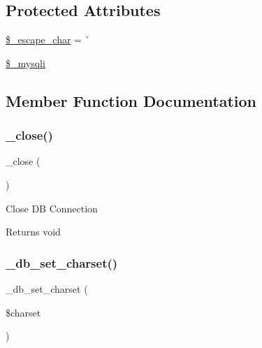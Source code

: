 \subsection*{Protected Attributes}
\begin{DoxyCompactItemize}
\item 
\mbox{\hyperlink{class_c_i___d_b__mysqli__driver_aaec2fb0112850159063a8e47ad3aed6e}{\$\+\_\+escape\+\_\+char}} = \textquotesingle{}\`{}\textquotesingle{}
\item 
\mbox{\hyperlink{class_c_i___d_b__mysqli__driver_ade098f0cd94dc706b24ea590bd540bf4}{\$\+\_\+mysqli}}
\end{DoxyCompactItemize}


\subsection{Member Function Documentation}
\mbox{\label{class_c_i___d_b__mysqli__driver_a4d9082658000e5ede8312067c6dda9db}} 
\subsubsection{\texorpdfstring{\+\_\+close()}{\_close()}}
{\footnotesize\ttfamily \+\_\+close (\begin{DoxyParamCaption}{ }\end{DoxyParamCaption})\hspace{0.3cm}{\ttfamily [protected]}}

Close DB Connection

\begin{DoxyReturn}{Returns}
void 
\end{DoxyReturn}
\mbox{\label{class_c_i___d_b__mysqli__driver_a2b808d420d8e9fea0b73ad7127f5efb8}} 
\subsubsection{\texorpdfstring{\+\_\+db\+\_\+set\+\_\+charset()}{\_db\_set\_charset()}}
{\footnotesize\ttfamily \+\_\+db\+\_\+set\+\_\+charset (\begin{DoxyParamCaption}\item[{}]{\$charset }\end{DoxyParamCaption})\hspace{0.3cm}{\ttfamily [protected]}}

